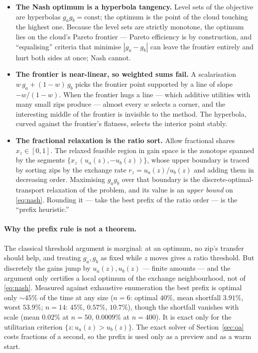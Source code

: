 \documentclass[11pt]{article}
\theoremstyle{definition}
\newcommand{\ga}{g_a}
\newcommand{\gb}{g_b}
\newcommand{\ua}{u_a}
\newcommand{\ub}{u_b}
\begin{document}
\begin{itemize}
\item \textbf{The Nash optimum is a hyperbola tangency.} Level sets of the objective are
hyperbolas $\ga\gb=\text{const}$; the optimum is the point of the cloud touching the
highest one. Because the level sets are strictly monotone, the optimum lies on the
cloud's Pareto frontier --- Pareto efficiency is by construction, and ``equalising''
criteria that minimise $|\ga-\gb|$ can leave the frontier entirely and hurt both sides
at once; Nash cannot.
\item \textbf{The frontier is near-linear, so weighted sums fail.} A scalarisation
$w\,\ga+(1-w)\,\gb$ picks the frontier point supported by a line of slope
$-w/(1-w)$. When the frontier hugs a line --- which additive utilities with many small
zips produce --- almost every $w$ selects a corner, and the interesting middle of the
frontier is invisible to the method. The hyperbola, curved against the frontier's
flatness, selects the interior point stably.
\item \textbf{The fractional relaxation is the ratio sort.} Allow fractional shares
$x_z\in[0,1]$. The relaxed feasible region in gain space is the zonotope spanned by the
segments $\{x_z\,(\ua(z),-\ub(z))\}$, whose upper boundary is traced by sorting zips by
the exchange rate $r_z=\ua(z)/\ub(z)$ and adding them in decreasing order. Maximising
$\ga\gb$ over that boundary is the discrete-optimal-transport relaxation of the problem,
and its value is an \emph{upper bound} on \eqref{eq:nash}. Rounding it --- take the best
prefix of the ratio order --- is the ``prefix heuristic.''
\end{itemize}

\paragraph{Why the prefix rule is not a theorem.}
The classical threshold argument is marginal: at an optimum, no zip's transfer should
help, and treating $\ga,\gb$ as fixed while $z$ moves gives a ratio threshold. But
discretely the gains jump by $\ua(z),\ub(z)$ --- finite amounts --- and the argument
only certifies a local optimum of the exchange neighbourhood, not of \eqref{eq:nash}.
Measured against exhaustive enumeration the best prefix is optimal only ${\sim}45\%$ of
the time at any size ($n=6$: optimal $40\%$, mean shortfall $3.91\%$, worst $53.9\%$;
$n=14$: $45\%$, $0.57\%$, $10.7\%$), though the shortfall vanishes with scale (mean
$0.02\%$ at $n=50$, $0.0009\%$ at $n=400$). It is exact only for the utilitarian
criterion $\{z:\ua(z)>\ub(z)\}$. The exact solver of Section~\ref{sec:oa} costs
fractions of a second, so the prefix is used only as a preview and as a warm start.
\end{document}
